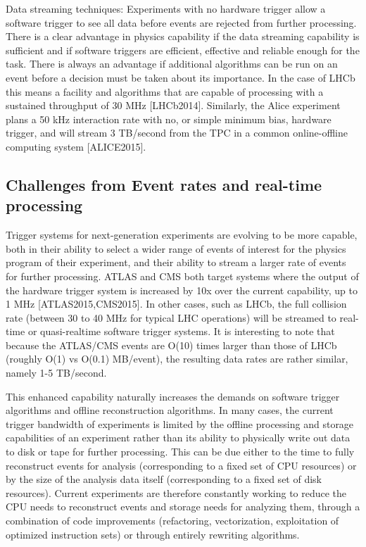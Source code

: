 Data streaming techniques: Experiments with no hardware trigger allow a software trigger to see all data before events are rejected from further processing. There is a clear advantage in physics capability if the data streaming capability is sufficient and if software triggers are efficient, effective and reliable enough for the task. There is always an advantage if additional algorithms can be run on an event before a decision must be taken about its importance. In the case of LHCb this means a facility and algorithms that are capable of processing with a sustained throughput of 30 MHz [LHCb2014]. Similarly, the Alice experiment plans a 50 kHz interaction rate with no, or simple minimum bias, hardware trigger, and will stream 3 TB/second from the TPC in a common online-offline computing system [ALICE2015].

\subsection{Challenges from Event rates and real-time processing}

Trigger systems for next-generation experiments are evolving to be more capable, both in their ability to select a wider range of events of interest for the physics program of their experiment, and their ability to stream a larger rate of events for further processing.  ATLAS and CMS both target systems where the output of the hardware trigger system is increased by 10x over the current capability, up to 1 MHz [ATLAS2015,CMS2015]. In other cases, such as LHCb, the full collision rate (between 30 to 40 MHz for typical LHC operations) will be streamed to real-time or quasi-realtime software trigger systems. It is interesting to note that because the ATLAS/CMS events are O(10) times larger than those of LHCb (roughly O(1) vs O(0.1) MB/event), the resulting data rates are rather similar, namely 1-5 TB/second. 

This enhanced capability naturally increases the demands on software trigger algorithms and offline reconstruction algorithms. In many cases, the current trigger bandwidth of experiments is limited by the offline processing and storage capabilities of an experiment rather than its ability to physically write out data to disk or tape for further processing.  This can be due either to the time to fully reconstruct events for analysis (corresponding to a fixed set of CPU resources)  or by the size of the analysis data itself (corresponding to a fixed set of disk resources). Current experiments are therefore constantly working to reduce the CPU needs to reconstruct events and storage needs for analyzing them, through a combination of code improvements (refactoring, vectorization, exploitation of optimized instruction sets) or through entirely rewriting algorithms. 

